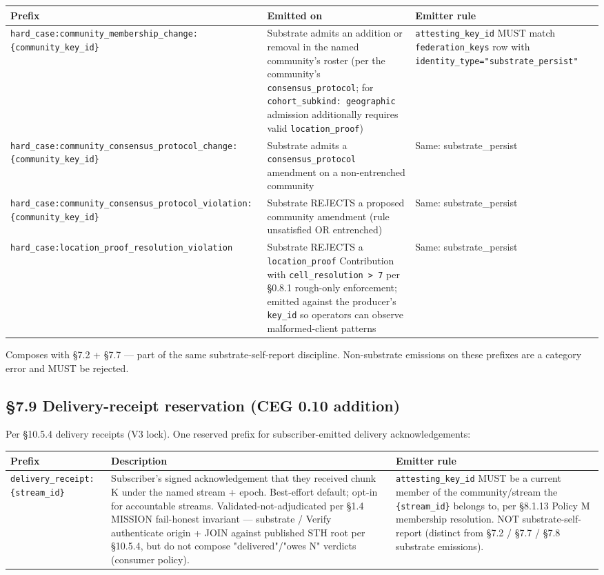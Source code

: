 \documentclass[11pt]{article}
\begin{document}
{\footnotesize
\begin{longtable}{|p{5.33cm}|p{5.33cm}|p{5.33cm}|}\hline
\textbf{Prefix} & \textbf{Emitted on} & \textbf{Emitter rule} \\ \hline\endhead
\texttt{hard\_case:community\_membership\_change:\{community\_key\_id\}} & Substrate admits an addition or removal in the named community's roster (per the community's \texttt{consensus\_protocol}; for \texttt{cohort\_subkind: geographic} admission additionally requires valid \texttt{location\_proof}) & \texttt{attesting\_key\_id} MUST match \texttt{federation\_keys} row with \texttt{identity\_type="substrate\_persist"} \\ \hline
\texttt{hard\_case:community\_consensus\_protocol\_change:\{community\_key\_id\}} & Substrate admits a \texttt{consensus\_protocol} amendment on a non-entrenched community & Same: substrate\_persist \\ \hline
\texttt{hard\_case:community\_consensus\_protocol\_violation:\{community\_key\_id\}} & Substrate REJECTS a proposed community amendment (rule unsatisfied OR entrenched) & Same: substrate\_persist \\ \hline
\texttt{hard\_case:location\_proof\_resolution\_violation} & Substrate REJECTS a \texttt{location\_proof} Contribution with \texttt{cell\_resolution > 7} per §0.8.1 rough-only enforcement; emitted against the producer's \texttt{key\_id} so operators can observe malformed-client patterns & Same: substrate\_persist \\ \hline
\end{longtable}}


Composes with §7.2 + §7.7 — part of the same substrate-self-report discipline. Non-substrate emissions on these prefixes are a category error and MUST be rejected.


\subsection*{§7.9 Delivery-receipt reservation (CEG 0.10 addition)}


Per §10.5.4 delivery receipts (V3 lock). One reserved prefix for subscriber-emitted delivery acknowledgements:


{\footnotesize
\begin{longtable}{|p{5.33cm}|p{5.33cm}|p{5.33cm}|}\hline
\textbf{Prefix} & \textbf{Description} & \textbf{Emitter rule} \\ \hline\endhead
\texttt{delivery\_receipt:\{stream\_id\}} & Subscriber's signed acknowledgement that they received chunk K under the named stream + epoch. Best-effort default; opt-in for accountable streams. Validated-not-adjudicated per §1.4 MISSION fail-honest invariant — substrate / Verify authenticate origin + JOIN against published STH root per §10.5.4, but do not compose "delivered"/"owes N" verdicts (consumer policy). & \texttt{attesting\_key\_id} MUST be a current member of the community/stream the \texttt{\{stream\_id\}} belongs to, per §8.1.13 Policy M membership resolution. NOT substrate-self-report (distinct from §7.2 / §7.7 / §7.8 substrate emissions). \\ \hline
\end{longtable}}
\end{document}
